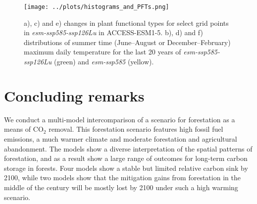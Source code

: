 \documentclass[]{article}
\begin{document}
\begin{figure}[H]
    \centering
    \texttt{[image: ../plots/histograms\_and\_PFTs.png]}
    \caption{a), c) and e) changes in plant functional types for select grid points in \textit{esm-ssp585-ssp126Lu} in ACCESS-ESM1-5. b), d) and f) distributions of summer time (June--August or December--February) maximum daily temperature for the last 20 years of \textit{esm-ssp585-ssp126Lu} (green) and \textit{esm-ssp585} (yellow).}
    \label{fig:tasmax_distribution}
\end{figure}

\section{Concluding remarks}

We conduct a multi-model intercomparison of a scenario for forestation as a means of CO$_2$ removal.
This forestation scenario features high fossil fuel emissions, a much warmer climate and moderate forestation and agricultural abandonment.
The models show a diverse interpretation of the spatial patterns of forestation, and as a result show a large range of outcomes for long-term carbon storage in forests.
Four models show a stable but limited relative carbon sink by 2100, while two models show that the mitigation gains from forestation in the middle of the century will be mostly lost by 2100 under such a high warming scenario.
\end{document}
